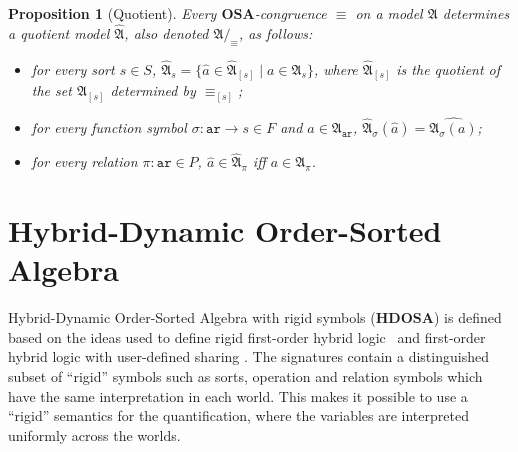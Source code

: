 \documentclass{article}
\newtheorem{proposition}[definition]{Proposition}
\newcommand{\OSA}{{\mathbf{OSA}}}
\newcommand{\HDOSA}{{\mathbf{HDOSA}}}
\newcommand{\A}{\mathfrak{A}}
\newcommand{\ari}{\mathtt{ar}}
\begin{document}
\begin{proposition}[Quotient]
  \label{prop:OSMA-quotient}
  Every \(\OSA\)-congruence \( \equiv\) on a model \( \A \) determines a \emph{quotient model} \(\widehat{\A}\), also denoted \(\A/_\equiv\), as follows:
  \begin{itemize}
  \item for every sort \(s \in S\), \(\widehat{\A}_{s} = \{\widehat{a} \in \widehat{\A}_{[s]} \mid a \in \A_{s}\}\), where \(\widehat{\A}_{[s]}\) is the quotient of the set \(\A_{[s]}\) determined by \(\equiv_{[s]}\);
  
  
  \item for every function symbol \(\sigma \colon \ari \to s\in F\) and \(a \in \A_{\ari}\), \(\widehat{\A}_{\sigma}(\widehat{a}) = \widehat{\A_{\sigma}(a)}\);
  
  \item for every relation \(\pi \colon \ari\in P\), \(\widehat{a} \in \widehat{\A}_{\pi}\) iff \(a \in \A_{\pi}\).
  
  \end{itemize}
\end{proposition}
\section{Hybrid-Dynamic Order-Sorted Algebra}

Hybrid-Dynamic Order-Sorted Algebra with rigid symbols ($\HDOSA$) is defined based on the ideas used to define rigid first-order hybrid logic~\cite{DBLP:conf/wollic/BlackburnMMH19} and first-order hybrid logic with user-defined sharing \cite{dia-msc,dia-qvh}. 
The signatures contain a distinguished subset of ``rigid'' symbols such as sorts, operation and relation symbols which have the same interpretation in each world. 
This makes it possible to use a ``rigid'' semantics for the quantification, where the variables are interpreted uniformly across the worlds.
\end{document}
